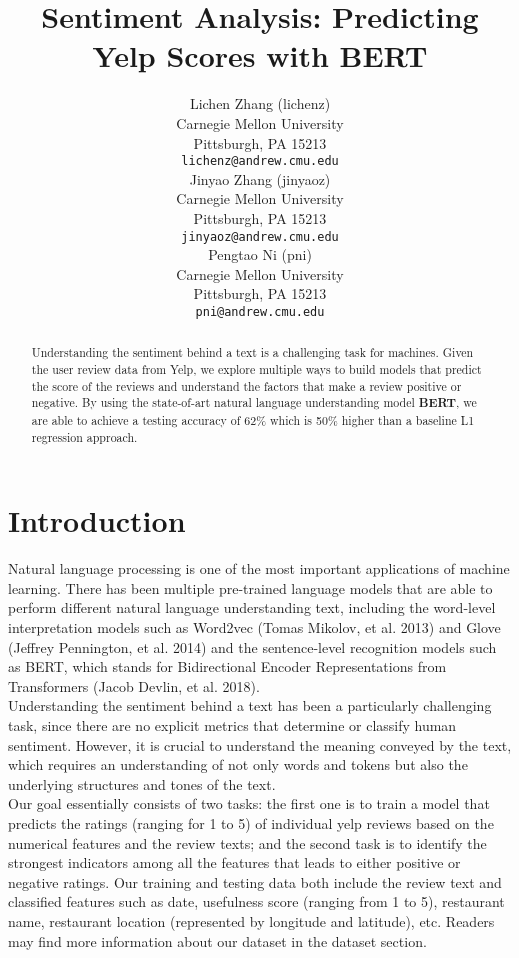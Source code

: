 \documentclass{article}
\title{Sentiment Analysis: Predicting Yelp Scores with BERT}
\author{
  Lichen Zhang (lichenz)\\
  Carnegie Mellon University\\
  Pittsburgh, PA 15213 \\
  \texttt{lichenz@andrew.cmu.edu} \\
  \And
  Jinyao Zhang (jinyaoz)\\
  Carnegie Mellon University \\
  Pittsburgh, PA 15213 \\
  \texttt{jinyaoz@andrew.cmu.edu} \\
  \And
  Pengtao Ni (pni)\\
  Carnegie Mellon University \\
  Pittsburgh, PA 15213 \\
  \texttt{pni@andrew.cmu.edu} 
}
\begin{document}

\maketitle

\begin{abstract}
  Understanding the sentiment behind a text is a challenging task for machines. Given the user review data from Yelp, we explore multiple ways to build models that predict the score of the reviews and understand the factors that make a review positive or negative. By using the state-of-art natural language understanding model \textbf{BERT}, we are able to achieve a testing accuracy of 62\% which is 50\% higher than a baseline L1 regression approach.
\end{abstract}

\section{Introduction}

Natural language processing is one of the most important applications of machine learning. There has been multiple pre-trained language models that are able to perform different natural language understanding text, including the word-level interpretation models such as Word2vec (Tomas Mikolov, et al. 2013)%
and Glove (Jeffrey Pennington, et al. 2014)%
 and the sentence-level recognition models such as BERT, which stands for Bidirectional Encoder Representations from Transformers (Jacob Devlin, et al. 2018). \\%
 
Understanding the sentiment behind a text has been a particularly challenging task, since there are no explicit metrics that determine or classify human sentiment. However, it is crucial to understand the meaning conveyed by the text, which requires an understanding of not only words and tokens but also the underlying structures and tones of the text. \\
 
Our goal essentially consists of two tasks: the first one is to train a model that predicts the ratings (ranging for 1 to 5) of individual yelp reviews based on the numerical features and the review texts; and the second task is to identify the strongest indicators among all the features that leads to either positive or negative ratings. Our training and testing data both include the review text and classified features such as date, usefulness score (ranging from 1 to 5), restaurant name, restaurant location (represented by longitude and latitude), etc. Readers may find more information about our dataset in the dataset section. \\
\end{document}
